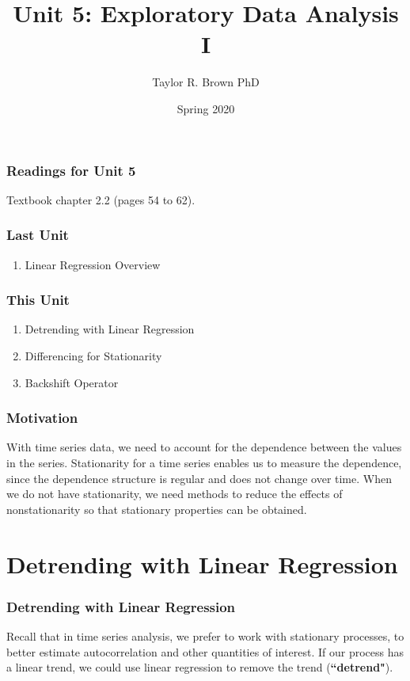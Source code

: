 \documentclass[%
xcolor=pdftex]{beamer}
\title{Unit 5: Exploratory Data Analysis I}
\author[STAT 5170: Applied Time Series, Unit 5]{Taylor R. Brown PhD}
\institute{Department of Statistics, University of Virginia}
\date{Spring 2020}
\begin{document}
\frame{\titlepage}


\begin{frame}
\frametitle{Readings for Unit 5}

Textbook chapter 2.2 (pages 54 to 62).

\end{frame}


\begin{frame}
\frametitle{Last Unit}
\begin{enumerate}
\item Linear Regression Overview
\end{enumerate}
\end{frame}

\begin{frame}
\frametitle{This Unit}
\begin{enumerate}
\item Detrending with Linear Regression
\item Differencing for Stationarity
\item Backshift Operator
\end{enumerate}
\end{frame}

\begin{frame}
\frametitle{Motivation}

With time series data, we need to account for the dependence between the values in the series. Stationarity for a time series enables us to measure the dependence, since the dependence structure is regular and does not change over time. When we do not have stationarity, we need methods to reduce the effects of nonstationarity so that stationary properties can be obtained.

\end{frame}

\section{Detrending with Linear Regression}
\frame{\tableofcontents[currentsection]}

\begin{frame}
\frametitle{Detrending with Linear Regression}

Recall that in time series analysis, we prefer to work with stationary processes, to better estimate autocorrelation and other quantities of interest. If our process has a linear trend, we could use linear regression to remove the trend (\textbf{``detrend"}).

\end{frame}
\end{document}
